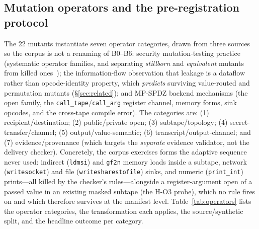 \documentclass[conference]{IEEEtran}
\newcommand{\code}[1]{\texttt{\small #1}}
\newcommand{\calltape}{\code{call\_tape}}
\newcommand{\callarg}{\code{call\_arg}}
\begin{document}
\subsection{Mutation operators and the pre-registration protocol}
\label{sec:protocol}
The 22 mutants instantiate seven operator categories, drawn from three sources so the
corpus is not a renaming of B0--B6: security mutation-testing practice (systematic operator
families, and separating \emph{stillborn} and \emph{equivalent} mutants from killed
ones~\cite{jiaharman,just2014}); the information-flow observation that leakage is a dataflow
rather than opcode-identity property, which \emph{predicts} surviving value-routed and
permutation mutants (\S\ref{sec:related}); and MP-SPDZ backend mechanisms (the open family,
the \calltape/\callarg{} register channel, memory forms, sink opcodes, and the cross-tape
compile error). The categories are: (1) recipient/destination; (2) public/private open; (3)
subtape/topology; (4) secret-transfer/channel; (5) output/value-semantic; (6)
transcript/output-channel; and (7) evidence/provenance (which targets the \emph{separate}
evidence validator, not the delivery checker). Concretely, the corpus exercises forms the
adaptive sequence never used: indirect (\code{ldmsi}) and \code{gf2n} memory loads inside a
subtape, network (\code{writesocket}) and file (\code{writesharestofile}) sinks, and numeric
(\code{print\_int}) prints---all killed by the checker's rules---alongside a
register-argument open of a passed value in an existing masked subtape (the H-O3 probe),
which no rule fires on and which therefore survives at the manifest level.
Table~\ref{tab:operators} lists the operator categories, the transformation each applies, the
source/synthetic split, and the headline outcome per category.
\end{document}
